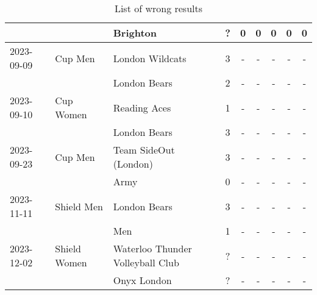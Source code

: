 \begin{table}
\begin{tabular}{|l|l|l|c|ccccc|}
			&         & Brighton      & ? & 0 & 0 & 0 & 0 & 0 \\
			\hline
			2023-09-09 & Cup Men & London Wildcats & 3 & - & - & - & - & - \\
			&         & London Bears    & 2 & - & - & - & - & - \\
			\hline
			2023-09-10 & Cup Women & Reading Aces & 1 & - & - & - & - & - \\
			&           & London Bears & 3 & - & - & - & - & - \\
			\hline
			2023-09-23 & Cup Men & Team SideOut (London) & 3 & - & - & - & - & - \\
			&         & Army                  & 0 & - & - & - & - & - \\
			\hline
			2023-11-11 & Shield Men & London Bears & 3 & - & - & - & - & - \\
			&            & Men          & 1 & - & - & - & - & - \\
			\hline
			2023-12-02 & Shield Women & Waterloo Thunder Volleyball Club & ? & - & - & - & - & - \\
			&              & Onyx London                      & ? & - & - & - & - & - \\
			\hline
		\end{tabular}
		\caption{List of wrong results}
		\label{table:error}
	\end{table}
